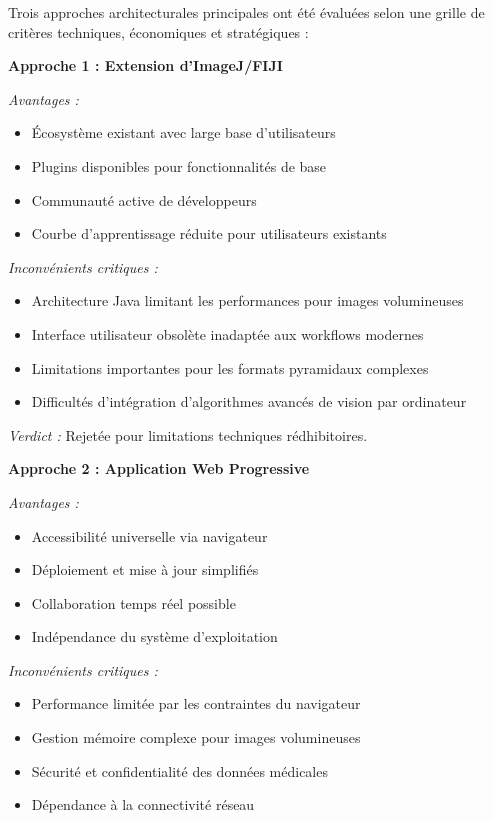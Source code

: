 \documentclass[12pt,a4paper]{article}
\begin{document}
Trois approches architecturales principales ont été évaluées selon une grille de critères techniques, économiques et stratégiques :

\textbf{Approche 1 : Extension d'ImageJ/FIJI}

\textit{Avantages :}
\begin{itemize}
\item Écosystème existant avec large base d'utilisateurs
\item Plugins disponibles pour fonctionnalités de base
\item Communauté active de développeurs
\item Courbe d'apprentissage réduite pour utilisateurs existants
\end{itemize}

\textit{Inconvénients critiques :}
\begin{itemize}
\item Architecture Java limitant les performances pour images volumineuses
\item Interface utilisateur obsolète inadaptée aux workflows modernes
\item Limitations importantes pour les formats pyramidaux complexes
\item Difficultés d'intégration d'algorithmes avancés de vision par ordinateur
\end{itemize}

\textit{Verdict :} Rejetée pour limitations techniques rédhibitoires.

\textbf{Approche 2 : Application Web Progressive}

\textit{Avantages :}
\begin{itemize}
\item Accessibilité universelle via navigateur
\item Déploiement et mise à jour simplifiés
\item Collaboration temps réel possible
\item Indépendance du système d'exploitation
\end{itemize}

\textit{Inconvénients critiques :}
\begin{itemize}
\item Performance limitée par les contraintes du navigateur
\item Gestion mémoire complexe pour images volumineuses
\item Sécurité et confidentialité des données médicales
\item Dépendance à la connectivité réseau
\end{itemize}
\end{document}
